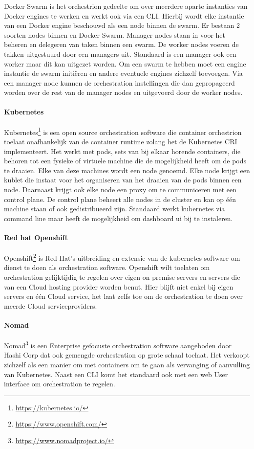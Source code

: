Docker Swarm is het orchestrion gedeelte om over meerdere aparte instanties van Docker engines te werken en werkt ook via een CLI. Hierbij wordt elke instantie van een Docker engine beschouwd als een node binnen de swarm. Er bestaan 2 soorten nodes binnen en Docker Swarm. Manager nodes staan in voor het beheren en delegeren van taken binnen een swarm. De worker nodes voeren de takken uitgestuurd door een managers uit. Standaard is een manager ook een worker maar dit kan uitgezet worden. Om een swarm te hebben moet een engine instantie de swarm initiëren en andere eventuele engines zichzelf toevoegen. Via een manager node kunnen de orchestration instellingen die dan gepropageerd worden over de rest van de manager nodes en uitgevoerd door de worker nodes.
\paragraph{Kubernetes}
Kubernetes\footnote{\url{https://kubernetes.io/}} is een open source orchestration software die container orchestrion toelaat onafhankelijk van de container runtime zolang het de Kubernetes CRI implementeert. Het werkt met pods,  sets van bij elkaar horende containers, die behoren tot een fysieke of virtuele machine die de mogelijkheid heeft om de pods te draaien. Elke van deze machines wordt een node genoemd. Elke node krijgt een kublet die instaat voor het organiseren van het draaien van de pods binnen een node. Daarnaast krijgt ook elke node een proxy om te communiceren met een control plane. De control plane beheert alle nodes in de cluster en kan op één machine staan of ook gedistribueerd zijn.  Standaard werkt kubernetes via command line maar heeft de mogelijkheid om dashboard ui bij te instaleren.
\paragraph{Red hat Openshift}
Openshift\footnote{\url{https://www.openshift.com/}} is Red Hat’s uitbreiding en extensie van de kubernetes software om dienst te doen als orchestration software. Openshift wilt toelaten om orchestration gelijktijdig te regelen over eigen on premise servers en servers die van een Cloud hosting provider worden benut. Hier blijft niet enkel bij eigen servers en één Cloud service, het laat zelfs toe om de orchestration te doen over meerde Cloud serviceproviders.
\paragraph{Nomad}
Nomad\footnote{\url{https://www.nomadproject.io/}} is een Enterprise gefocuste orchestration software aangeboden door Hashi Corp dat ook gemengde orchestration op grote schaal toelaat. Het verkoopt zichzelf als een manier om met containers om te gaan als vervanging of aanvulling van Kubernetes. Naast een CLI komt het standaard ook met een web User interface om orchestration te regelen.
